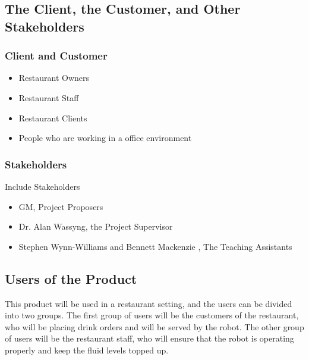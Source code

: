 \documentclass [11pt]{article}
\begin{document}
\subsection{The Client, the Customer, and Other Stakeholders}

\subsubsection{Client and Customer}
	\begin{itemize}
	\item Restaurant Owners
	\item Restaurant Staff
	\item Restaurant Clients
	\item People who are working in a office environment
\end{itemize} 

\subsubsection{Stakeholders}
 Include Stakeholders
		\begin{itemize}
 		\item GM, Project Proposers 
 		\item Dr. Alan Wassyng, the Project Supervisor
 		\item Stephen Wynn-Williams and Bennett Mackenzie , The Teaching Assistants
		\end{itemize} 

\subsection{Users of the Product} 
This product will be used in a restaurant setting, and the users can be divided into two groups. The first group of users will be the customers of the restaurant, who will be placing drink orders and will be served by the robot. The other group of users will be the restaurant staff, who will ensure that the robot is operating properly and keep the fluid levels topped up.
\end{document}
